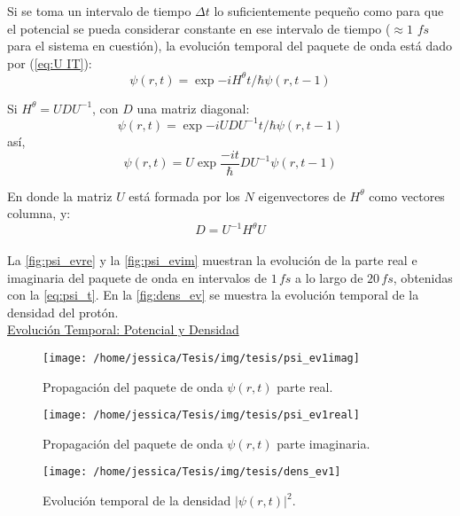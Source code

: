 Si se toma un intervalo de tiempo $\Delta t$ lo suficientemente pequeño como para que el potencial se pueda considerar constante en ese intervalo de tiempo ($\approx 1\,\,fs$ para el sistema en cuestión), la evolución temporal del paquete de onda está dado por (\autoref{eq:U IT}):
\begin{equation}
  \label{eq:wp_ev}
  \psi(r,t)=\exp{-iH^{\theta}t/\hbar}\psi(r,t-1)
\end{equation}

Si $H^{\theta} = UDU^{-1}$, con $D$ una matriz diagonal:
$$ \psi(r,t) = \exp{-iUDU^{-1}t/\hbar}\psi(r,t-1)$$  
así,
\begin{equation}
  \label{eq:psi_t}
\psi(r,t) = U\exp{\frac{-it}{\hbar}D}U^{-1}\psi(r,t-1)
\end{equation}

En donde la matriz $U$ está formada por los $N$ eigenvectores de $H^{\theta}$ como vectores columna, y:
$$D=U^{-1}H^{\theta}U$$
\\

La \autoref{fig:psi_evre} y la \autoref{fig:psi_evim} muestran la evolución de la parte real e imaginaria del paquete de onda en intervalos de $1\,fs$ a lo largo de $20\,fs$, obtenidas con la \autoref{eq:psi_t}. En la \autoref{fig:dens_ev} se muestra la evolución temporal de la densidad del protón.\\
\href{https://github.com/Jessi-MM/PropagatorLearning/blob/main/src/Animacion/gifs/animation-dens\%26pot.gif}{\faPlayCircle[regular] Evolución Temporal: Potencial y Densidad}

\begin{figure}[!htbp]
  \centering
  \texttt{[image: /home/jessica/Tesis/img/tesis/psi\_ev1imag]}
  \caption{Propagación del paquete de onda $\psi(r,t)$ parte real.}
  \label{fig:psi_evre}
\end{figure}

\begin{figure}[!htbp]
  \centering
  \texttt{[image: /home/jessica/Tesis/img/tesis/psi\_ev1real]}
  \caption{Propagación del paquete de onda $\psi(r,t)$ parte imaginaria.}
  \label{fig:psi_evim}
\end{figure}

\begin{figure}[!htbp]
  \centering
  \texttt{[image: /home/jessica/Tesis/img/tesis/dens\_ev1]}
  \caption{Evolución temporal de la densidad $|\psi(r,t)|^2$.}
  \label{fig:dens_ev}
\end{figure}

